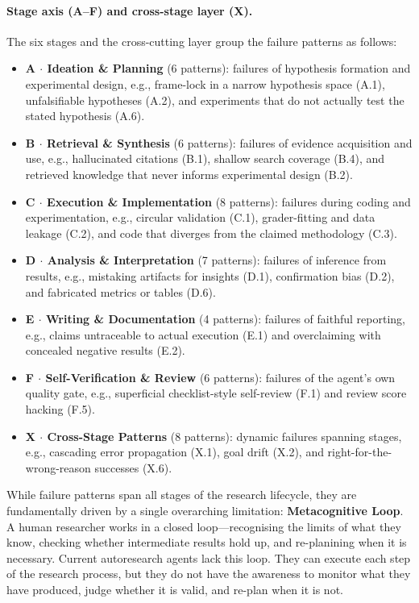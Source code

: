 \paragraph{Stage axis (A--F) and cross-stage layer (X).}
The six stages and the cross-cutting layer group the failure patterns as follows:
\begin{itemize}[leftmargin=1.6em, itemsep=2pt, parsep=0pt]
    \item \textbf{A $\cdot$ Ideation \& Planning} (6 patterns): failures of hypothesis formation and experimental design, e.g., frame-lock in a narrow hypothesis space (A.1), unfalsifiable hypotheses (A.2), and experiments that do not actually test the stated hypothesis (A.6).
    \item \textbf{B $\cdot$ Retrieval \& Synthesis} (6 patterns): failures of evidence acquisition and use, e.g., hallucinated citations (B.1), shallow search coverage (B.4), and retrieved knowledge that never informs experimental design (B.2).
    \item \textbf{C $\cdot$ Execution \& Implementation} (8 patterns): failures during coding and experimentation, e.g., circular validation (C.1), grader-fitting and data leakage (C.2), and code that diverges from the claimed methodology (C.3).
    \item \textbf{D $\cdot$ Analysis \& Interpretation} (7 patterns): failures of inference from results, e.g., mistaking artifacts for insights (D.1), confirmation bias (D.2), and fabricated metrics or tables (D.6).
    \item \textbf{E $\cdot$ Writing \& Documentation} (4 patterns): failures of faithful reporting, e.g., claims untraceable to actual execution (E.1) and overclaiming with concealed negative results (E.2).
    \item \textbf{F $\cdot$ Self-Verification \& Review} (6 patterns): failures of the agent's own quality gate, e.g., superficial checklist-style self-review (F.1) and review score hacking (F.5).
    \item \textbf{X $\cdot$ Cross-Stage Patterns} (8 patterns): dynamic failures spanning stages, e.g., cascading error propagation (X.1), goal drift (X.2), and right-for-the-wrong-reason successes (X.6).
\end{itemize}

\begin{tcolorbox}[colback=blue!5!white,colframe=blue!75!black,
  title=\textbf{Ultimate Root Cause: Metacognitive Loop}]
While failure patterns span all stages of the research lifecycle, they
are fundamentally driven by a single overarching limitation:
\textbf{Metacognitive Loop}. A human researcher works in a closed
loop---recognising the limits of what they know, checking whether
intermediate results hold up, and  re-planining when it is necessary.
Current autoresearch agents lack this loop. They can execute each
step of the research process, but they do not have the awareness to monitor what they have
produced, judge whether it is valid, and re-plan when it is
not.
\end{tcolorbox}
 
